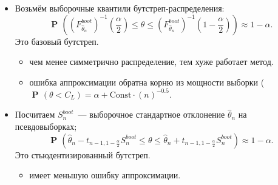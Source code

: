\documentclass[9pt,pdf,utf8,hyperref={unicode},aspectratio=169]{beamer}
\DeclareMathOperator{\prob}{\mathbf{P}\!}
\begin{document}
\begin{frame}
		\begin{itemize}
			
			\item Возьмём выборочные квантили бутстреп-распределения:
			$$\prob\left(\left(F_{\hat{\theta}_n}^{boot}\right)^{-1}\left(\frac{\alpha}{2}\right) \leq \theta \leq \left(F_{\hat{\theta}_n}^{boot}\right)^{-1}\left(1-\frac{\alpha}{2}\right) \right)\approx 1-\alpha.$$	
			Это базовый бутстреп.
			\begin{itemize}
			    \item чем менее симметрично распределение, тем хуже работает метод.
			    \item ошибка аппроксимации обратна корню из мощности выборки ($\prob({\theta}<C_L) = \alpha + \text{Const} \cdot  (n)^{-0.5}.$
			\end{itemize}

\item Посчитаем $S_n^{boot}$~--- выборочное стандартное отклонение $\hat{\theta}_n$ на псевдовыборках; 
			$$\prob \left(\hat{\theta}_n - t_{n-1, 1-\frac{\alpha}{2}} S_n^{boot}  \leq \theta \leq \hat{\theta}_n + t_{n-1, 1-\frac{\alpha}{2}} S_n^{boot}\right)\approx 1-\alpha.$$	
			Это стьюдентизированный бутстреп.
			\begin{itemize}
			    \item имеет меньшую ошибку аппроксимации.
			\end{itemize}
		\end{itemize}
	

\end{frame}
\end{document}
